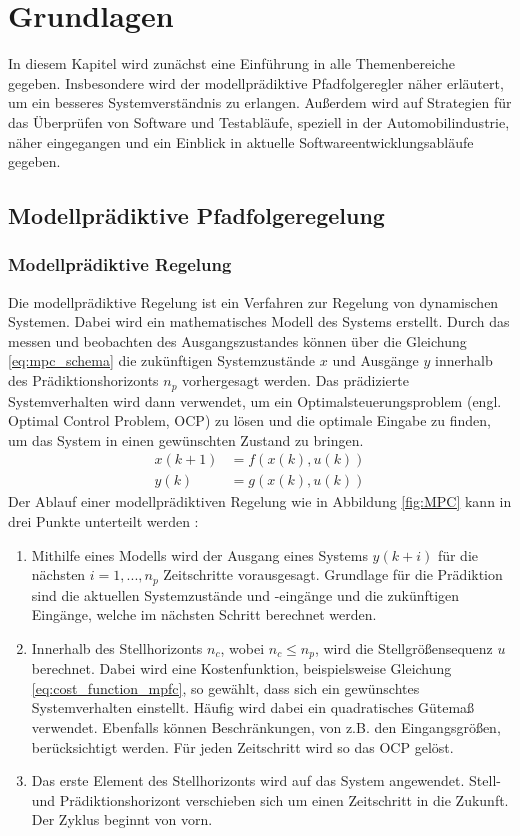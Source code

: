 \chapter{Grundlagen} \label{chap:Grundlagen}
\thispagestyle{empty}
In diesem Kapitel wird zunächst eine Einführung in alle Themenbereiche gegeben. Insbesondere wird der modellprädiktive Pfadfolgeregler näher erläutert, um ein besseres Systemverständnis zu erlangen. Außerdem wird auf  Strategien für das Überprüfen von Software und Testabläufe, speziell in der Automobilindustrie, näher eingegangen und ein Einblick in aktuelle Softwareentwicklungsabläufe gegeben. 
\section{Modellprädiktive Pfadfolgeregelung} \label{sec:MPFC}
\subsection{Modellprädiktive Regelung}
Die modellprädiktive Regelung ist ein Verfahren zur Regelung von dynamischen Systemen. Dabei wird ein mathematisches Modell des Systems erstellt. Durch das messen und beobachten des Ausgangszustandes können über die Gleichung \ref{eq:mpc_schema} die zukünftigen Systemzustände $x$ und Ausgänge $y$ innerhalb des Prädiktionshorizonts $n_p$ vorhergesagt werden. Das prädizierte Systemverhalten wird dann verwendet, um ein Optimalsteuerungsproblem (engl. Optimal Control Problem, OCP) zu lösen und die optimale Eingabe zu finden, um das System in einen gewünschten Zustand zu bringen.
\begin{equation}
    \begin{split}
        x(k+1)  &= f(x(k), u(k)) \\
        y(k)    &= g(x(k), u(k))
    \end{split}
    \label{eq:mpc_schema}
\end{equation}
Der Ablauf einer modellprädiktiven Regelung wie in Abbildung \ref{fig:MPC} kann in drei Punkte unterteilt werden \cite{camacho2013model}:
\begin{enumerate}
    \item Mithilfe eines Modells wird der Ausgang eines Systems $y(k+i)$ für die nächsten $i = 1, ..., n_p$ Zeitschritte vorausgesagt. Grundlage für die Prädiktion sind die aktuellen Systemzustände und -eingänge und die zukünftigen Eingänge, welche im nächsten Schritt berechnet werden.
    \item Innerhalb des Stellhorizonts $n_c$, wobei $n_c \leq n_p$, wird die Stellgrößensequenz $u$ berechnet. Dabei wird eine Kostenfunktion, beispielsweise Gleichung \ref{eq:cost_function_mpfc}, so gewählt, dass sich ein gewünschtes Systemverhalten einstellt. Häufig wird dabei ein quadratisches Gütemaß verwendet. Ebenfalls können Beschränkungen, von z.B. den Eingangsgrößen, berücksichtigt werden. Für jeden Zeitschritt wird so das OCP gelöst.
    \item Das erste Element des Stellhorizonts wird auf das System angewendet. Stell- und Prädiktionshorizont verschieben sich um einen Zeitschritt in die Zukunft. Der Zyklus beginnt von vorn. 
\end{enumerate}
